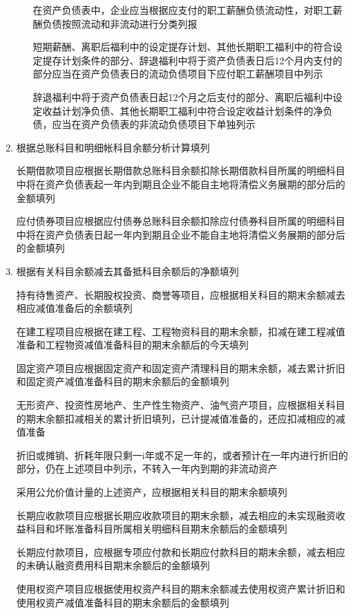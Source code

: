 \documentclass[UTF8,12pt]{ctexart}
\numberwithin{equation}{section} %
\numberwithin{figure}{section}
\numberwithin{table}{section}
\begin{document}
\begin{enumerate}
\begin{enumerate}
			在资产负债表中，企业应当根据应支付的职工薪酬负债流动性，对职工薪酬负债按照流动和非流动进行分类列报
			
			短期薪酬、离职后福利中的设定提存计划、其他长期职工福利中的符合设定提存计划条件的部分、辞退福利中将于资产负债表日后12个月内支付的部分应当在资产负债表日的流动负债项目下应付职工薪酬项目中列示
			
			辞退福利中将于资产负债表日起12个月之后支付的部分、离职后福利中设定收益计划净负债、其他长期职工福利中符合设定收益计划条件的净负债，应当在资产负债表的非流动负债项目下单独列示
		\end{enumerate}
		
		\item 根据总账科目和明细帐科目余额分析计算填列
		
		长期借款项目应根据长期借款总账科目余额扣除长期借款科目所属的明细科目中将在资产负债表起一年内到期且企业不能自主地将清偿义务展期的部分后的金额填列
		
		应付债券项目应根据应付债券总账科目余额扣除应付债券科目所属的明细科目中将在资产负债表日起一年内到期且企业不能自主地将清偿义务展期的部分后的金额填列
		
		\item 根据有关科目余额减去其备抵科目余额后的净额填列
		
		持有待售资产、长期股权投资、商誉等项目，应根据相关科目的期末余额减去相应减值准备后的余额填列
		
		在建工程项目应根据在建工程、工程物资科目的期末余额，扣减在建工程减值准备和工程物资减值准备科目的期末余额后的今天填列
		
		固定资产项目应根据固定资产和固定资产清理科目的期末余额，减去累计折旧和固定资产减值准备科目的期末余额后的金额填列
		
		无形资产、投资性房地产、生产性生物资产、油气资产项目，应根据相关科目的期末余额扣减相关的累计折旧填列，已计提减值准备的，还应扣减相应的减值准备
		
		折旧或摊销、折耗年限只剩一i年或不足一年的，或者预计在一年内进行折旧的部分，仍在上述项目中列示，不转入一年内到期的非流动资产
		
		采用公允价值计量的上述资产，应根据相关科目的期末余额填列
		
		长期应收款项目应根据长期应收款项目的期末余额，减去相应的未实现融资收益科目和坏账准备科目所属相关明细科目期末余额后的金额填列
		
		长期应付款项目，应根据专项应付款和长期应付款科目的期末余额，减去相应的未确认融资费用科目期末余额后的金额填列
		
		使用权资产项目应根据使用权资产科目的期末余额减去使用权资产累计折旧和使用权资产减值准备科目的期末余额后的金额填列
		

\end{enumerate}
\end{document}
